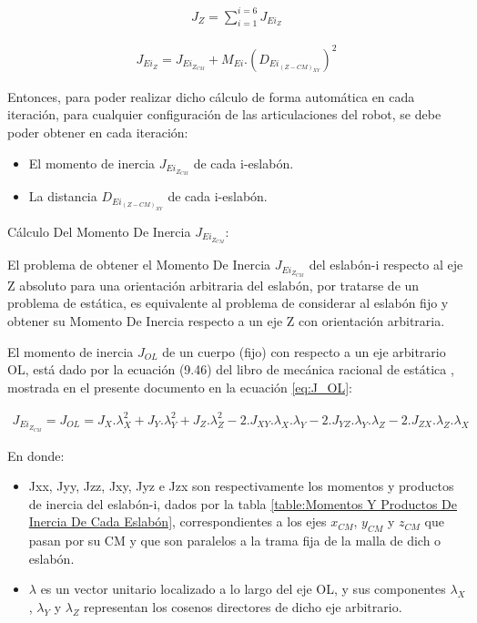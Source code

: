 \documentclass{article}
\begin{document}
\begin{sloppypar}
\begin{align} \label{eq:J_Z}
	J_Z=\sum_{i=1}^{i=6}J_{Ei_Z}
\end{align}

\begin{align} \label{eq:J_Ei_Z}
    J_{Ei_Z}=J_{Ei_{Z_{CM}}}+M_{Ei}.(D_{Ei_{(Z-CM)_{XY}}})^2
\end{align}

Entonces, para poder realizar dicho cálculo de forma automática en cada iteración, para cualquier configuración de las articulaciones del robot, se debe poder obtener en cada iteración:
\begin{itemize}
    \item El momento de inercia $J_{Ei_{Z_{CM}}}$ de cada i-eslabón.
    \item La distancia $D_{Ei_{(Z-CM)_{XY}}}$ de cada i-eslabón.
\end{itemize}


\hfill

Cálculo Del Momento De Inercia $J_{Ei_{Z_{CM}}}$:

\hfill

El problema de obtener el Momento De Inercia $J_{Ei_{Z_{CM}}}$ del eslabón-i respecto al eje Z absoluto para una orientación arbitraria del eslabón, por tratarse de un problema de estática, es equivalente al problema de considerar al eslabón fijo y obtener su Momento De Inercia respecto a un eje Z con orientación arbitraria.


El momento de inercia $J_{OL}$ de un cuerpo (fijo) con respecto a un eje arbitrario OL, está dado por la ecuación (9.46) del libro de mecánica racional de estática \cite{beermecanica}, mostrada en el presente documento en la ecuación \ref{eq:J_OL}:

\begin{align} \label{eq:J_OL}
    J_{Ei_{Z_{CM}}} = J_{OL} = J_X.\lambda_X^2+J_Y.\lambda_Y^2+J_Z.\lambda_Z^2-2.J_{XY}.\lambda_X.\lambda_Y-2.J_{YZ}.\lambda_Y.\lambda_Z-2.J_{ZX}.\lambda_Z.\lambda_X
\end{align}

En donde:
\begin{itemize}
    \item Jxx, Jyy, Jzz, Jxy, Jyz e Jzx son respectivamente los momentos y productos de inercia del eslabón-i, dados por la tabla \ref{table:Momentos Y Productos De Inercia De Cada Eslabón}, correspondientes a los ejes $x_{CM}$, $y_{CM}$ y $z_{CM}$ que pasan por su CM y que son paralelos a la trama fija de la malla de dich o eslabón.
    \item $\lambda$ es un vector unitario localizado a lo largo del eje OL, y sus componentes $\lambda_X$, $\lambda_Y$ y $\lambda_Z$ representan los cosenos directores de dicho eje arbitrario.
\end{itemize}


\end{sloppypar}
\end{document}
